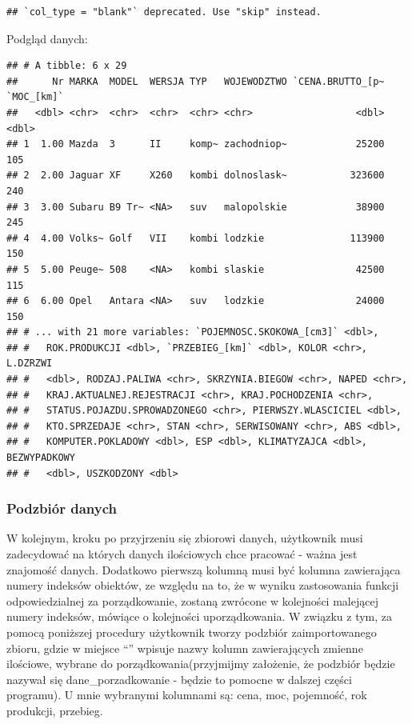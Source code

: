 \documentclass[12pt,a4paper]{report}
\begin{document}
{\begin{verbatim}
## `col_type = "blank"` deprecated. Use "skip" instead.
\end{verbatim}

Podgląd danych:

\begin{Shaded}
\begin{Highlighting}[]
\end{Highlighting}
\end{Shaded}

\begin{verbatim}
## # A tibble: 6 x 29
##      Nr MARKA  MODEL  WERSJA TYP   WOJEWODZTWO `CENA.BRUTTO_[p~ `MOC_[km]`
##   <dbl> <chr>  <chr>  <chr>  <chr> <chr>                  <dbl>      <dbl>
## 1  1.00 Mazda  3      II     komp~ zachodniop~            25200        105
## 2  2.00 Jaguar XF     X260   kombi dolnoslask~           323600        240
## 3  3.00 Subaru B9 Tr~ <NA>   suv   malopolskie            38900        245
## 4  4.00 Volks~ Golf   VII    kombi lodzkie               113900        150
## 5  5.00 Peuge~ 508    <NA>   kombi slaskie                42500        115
## 6  6.00 Opel   Antara <NA>   suv   lodzkie                24000        150
## # ... with 21 more variables: `POJEMNOSC.SKOKOWA_[cm3]` <dbl>,
## #   ROK.PRODUKCJI <dbl>, `PRZEBIEG_[km]` <dbl>, KOLOR <chr>, L.DZRZWI
## #   <dbl>, RODZAJ.PALIWA <chr>, SKRZYNIA.BIEGOW <chr>, NAPED <chr>,
## #   KRAJ.AKTUALNEJ.REJESTRACJI <chr>, KRAJ.POCHODZENIA <chr>,
## #   STATUS.POJAZDU.SPROWADZONEGO <chr>, PIERWSZY.WLASCICIEL <dbl>,
## #   KTO.SPRZEDAJE <chr>, STAN <chr>, SERWISOWANY <chr>, ABS <dbl>,
## #   KOMPUTER.POKLADOWY <dbl>, ESP <dbl>, KLIMATYZAJCA <dbl>, BEZWYPADKOWY
## #   <dbl>, USZKODZONY <dbl>
\end{verbatim}

\subsubsection{Podzbiór danych}\label{podzbior-danych}

W kolejnym, kroku po przyjrzeniu się zbiorowi danych, użytkownik musi
zadecydować na których danych ilościowych chce pracować - ważna jest
znajomość danych. Dodatkowo pierwszą kolumną musi być kolumna
zawierająca numery indeksów obiektów, ze względu na to, że w wyniku
zastosowania funkcji odpowiedzialnej za porządkowanie, zostaną zwrócone
w kolejności malejącej numery indeksów, mówiące o kolejności
uporządkowania. W związku z tym, za pomocą poniższej procedury
użytkownik tworzy podzbiór zaimportowanego zbioru, gdzie w miejsce ``''
wpisuje nazwy kolumn zawierających zmienne ilościowe, wybrane do
porządkowania(przyjmijmy założenie, że podzbiór będzie nazywał się
dane\_porzadkowanie - będzie to pomocne w dalszej części programu). U
mnie wybranymi kolumnami są: cena, moc, pojemność, rok produkcji,
przebieg.

}
\end{document}
